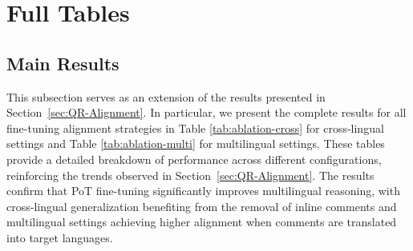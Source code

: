 \section{Full Tables}

\subsection{Main Results}
\label{ap:full-main}

This subsection serves as an extension of the results presented in Section~\ref{sec:QR-Alignment}.
%
In particular, we present the complete results for all fine-tuning alignment strategies in Table \ref{tab:ablation-cross} for cross-lingual settings and Table \ref{tab:ablation-multi} for multilingual settings.
%
These tables provide a detailed breakdown of performance across different configurations, reinforcing the trends observed in Section~\ref{sec:QR-Alignment}. 
%
The results confirm that PoT fine-tuning significantly improves multilingual reasoning, with cross-lingual generalization benefiting from the removal of inline comments and multilingual settings achieving higher alignment when comments are translated into target languages.

